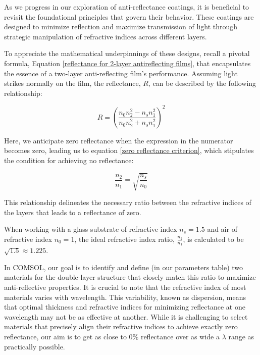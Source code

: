 As we progress in our exploration of anti-reflectance coatings, it is beneficial to revisit the foundational principles that govern their behavior. These coatings are designed to minimize reflection and maximize transmission of light through strategic manipulation of refractive indices across different layers.

To appreciate the mathematical underpinnings of these designs, recall a pivotal formula, Equation \ref{reflectance for 2-layer antireflecting films}, that encapsulates the essence of a two-layer anti-reflecting film's performance. Assuming light strikes normally on the film, the reflectance, $R$, can be described by the following relationship:

\begin{equation}\label{reflectance for 2-layer antireflecting films - chap4}
    R = \left(\frac{n_0n_2^2 - n_sn_1^2}{n_0n_2^2 + n_sn_1^2}\right)^2
\end{equation}

Here, we anticipate zero reflectance when the expression in the numerator becomes zero, leading us to equation \ref{zero reflectance criterion}, which stipulates the condition for achieving no reflectance:

\begin{equation}\label{zero reflectance criterion - chap4}
    \frac{n_2}{n_1} = \sqrt{\frac{n_s}{n_0}}
\end{equation}

This relationship delineates the necessary ratio between the refractive indices of the layers that leads to a reflectance of zero.

When working with a glass substrate of refractive index $n_s = 1.5$ and air of refractive index $n_0 = 1$, the ideal refractive index ratio, $\frac{n_2}{n_1}$, is calculated to be $\sqrt{1.5} \approx 1.225$.

In COMSOL, our goal is to identify and define (in our parameters table) two materials for the double-layer structure that closely match this ratio to maximize anti-reflective properties. It is crucial to note that the refractive index of most materials varies with wavelength. This variability, known as dispersion, means that optimal thickness and refractive indices for minimizing reflectance at one wavelength may not be as effective at another. While it is challenging to select materials that precisely align their refractive indices to achieve exactly zero reflectance, our aim is to get as close to 0\% reflectance over as wide a $\lambda$ range as practically possible.

